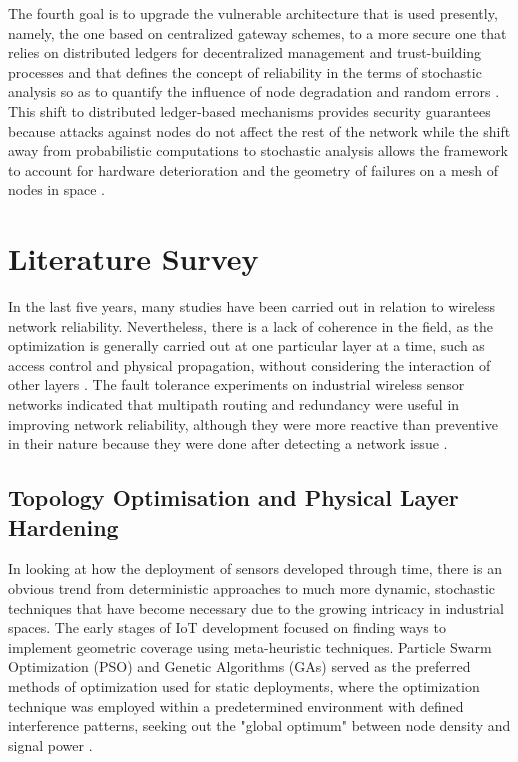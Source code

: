 \documentclass[a4paper,fleqn]{cas-dc}
\numberwithin{equation}{section}
\begin{document}
The fourth goal is to upgrade the vulnerable architecture that is used presently, namely, the one based on centralized gateway schemes, to a more secure one that relies on distributed ledgers for decentralized management and trust-building processes and that defines the concept of reliability in the terms of stochastic analysis so as to quantify the influence of node degradation and random errors \cite{b3, b6, Priyanka_2024_Synchronization}. This shift to distributed ledger-based mechanisms provides security guarantees because attacks against nodes do not affect the rest of the network while the shift away from probabilistic computations to stochastic analysis allows the framework to account for hardware deterioration and the geometry of failures on a mesh of nodes in space \cite{Shakhov_2024_LongWSN, Liu_2025_LinearWSN, Savadatti_2025_DLT_Survey, Shamir_2025_Blockchain_IoT}.

\section{Literature Survey}

In the last five years, many studies have been carried out in relation to wireless network reliability. Nevertheless, there is a lack of coherence in the field, as the optimization is generally carried out at one particular layer at a time, such as access control and physical propagation, without considering the interaction of other layers \cite{Chen_2021_Survey}. The fault tolerance experiments on industrial wireless sensor networks indicated that multipath routing and redundancy were useful in improving network reliability, although they were more reactive than preventive in their nature because they were done after detecting a network issue \cite{Ali_2021_Multipath}.

\subsection{Topology Optimisation and Physical Layer Hardening}

In looking at how the deployment of sensors developed through time, there is an obvious trend from deterministic approaches to much more dynamic, stochastic techniques that have become necessary due to the growing intricacy in industrial spaces. The early stages of IoT development focused on finding ways to implement geometric coverage using meta-heuristic techniques. Particle Swarm Optimization (PSO) and Genetic Algorithms (GAs) served as the preferred methods of optimization used for static deployments, where the optimization technique was employed within a predetermined environment with defined interference patterns, seeking out the "global optimum" between node density and signal power \cite{Moraes_2024_JointInterference, Nasir_2022_EnergyAware}.
\end{document}
